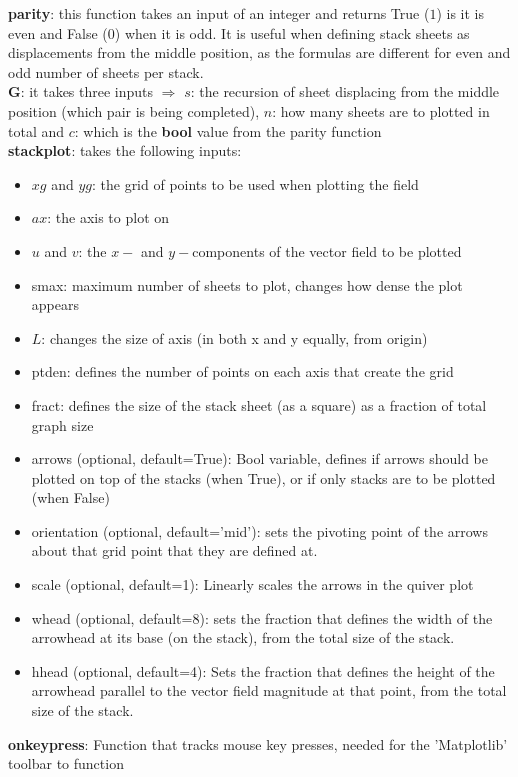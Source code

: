 \documentclass[12pt]{report}
\begin{document}
\textbf{parity}: this function takes an input of an integer and returns True ($1$) is it is even and False ($0$) when it is odd. It is useful when defining stack sheets as displacements from the middle position, as the formulas are different for even and odd number of sheets per stack.\\
\textbf{G}: it takes three inputs $\Rightarrow$ $s$: the recursion of sheet displacing from the middle position (which pair is being completed), $n$: how many sheets are to plotted in total and $c$: which is the \textbf{bool} value from the parity function\\
\textbf{stack\textunderscore plot}: takes the following inputs:
\begin{itemize}
	\item $xg$ and $yg$: the grid of points to be used when plotting the field
	\item $ax$: the axis to plot on
	\item $u$ and $v$: the $x-$ and $y-$components of the vector field to be plotted
	\item s\textunderscore max: maximum number of sheets to plot, changes how dense the plot appears
	\item $L$: changes the size of axis (in both x and y equally, from origin)
	\item pt\textunderscore den: defines the number of points on each axis that create the grid
	\item fract: defines the size of the stack sheet (as a square) as a fraction of total graph size
	\item arrows (optional, default=True): Bool variable, defines if arrows should be plotted on top of the stacks (when True), or if only stacks are to be plotted (when False)
	\item orientation (optional, default='mid'): sets the pivoting point of the arrows about that grid point that they are defined at.
	\item scale (optional, default=1): Linearly scales the arrows in the quiver plot
	\item w\textunderscore head (optional, default=8): sets the fraction that defines the width of the arrowhead at its base (on the stack), from the total size of the stack.
	\item h\textunderscore head (optional, default=4): Sets the fraction that defines the height of the arrowhead parallel to the vector field magnitude at that point, from the total size of the stack.
\end{itemize}
\textbf{on\textunderscore key\textunderscore press}: Function that tracks mouse key presses, needed for the 'Matplotlib' toolbar to function\\
\end{document}
